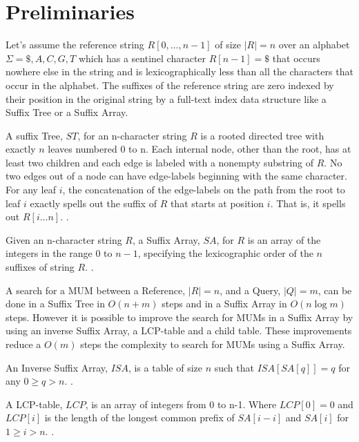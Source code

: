 \documentclass{acm_proc_article-sp}
\begin{document}
\section{Preliminaries}
Let's assume the reference string $R[0,\ldots, n-1]$ of size $|R|=n$ over an alphabet $\Sigma={ \$, A, C, G, T}$ which has a sentinel character $R[n-1] = \$$ that occurs nowhere else in the string and is lexicographically less than all the characters that occur in the alphabet. The suffixes of the reference string are zero indexed by their position in the original string by a full-text index data structure like a Suffix Tree or a Suffix Array. 
\begin{definition}
A suffix Tree, $ST$, for an n-character string $R$ is a rooted directed tree with exactly $n$ leaves numbered 0 to n. Each internal node, other than the root, has at least two children and each edge is labeled with a nonempty substring of $R$. No two edges out of a node can have edge-labels beginning with the same character. For any leaf $i$, the concatenation of the edge-labels on the path from the root to leaf $i$ exactly spells out the suffix of $R$ that starts at position $i$. That is, it spells out $R[i\ldots n]$. \cite{Gusfield1997}.
\end{definition}
\begin{definition}
Given an n-character string $R$, a Suffix Array, $SA$, for $R$ is an array of the integers in the range 0 to $n-1$, specifying the lexicographic order of the $n$ suffixes of string $R$. \cite{Gusfield1997}.
\end{definition}
A search for a MUM between a Reference, $|R|=n$, and a Query, $|Q|=m$,  can be done in a Suffix Tree in $O(n+m)$ steps and in a Suffix Array in $O(n\log m)$ steps. However it is possible to improve the search for MUMs in a Suffix Array by using an inverse Suffix Array, a LCP-table and a child table. These improvements reduce a $O(m)$ steps \cite{Abouelhoda2004} the complexity to search for MUMs using a Suffix Array.
\begin{definition}
An Inverse Suffix Array, $ISA$, is a table of size $n$ such that $ISA[SA[q]]=q$ for any $0\geq q> n$. \cite{Abouelhoda2004}.
\end{definition}
\begin{definition}
A LCP-table, $LCP$, is an array of integers from 0 to n-1. Where $LCP[0]=0$ and $LCP[i]$ is the length of the longest common prefix of $SA[i-i]$ and $SA[i]$ for $1\geq i>n$. \cite{Abouelhoda2004}.
\end{definition}
\end{document}
